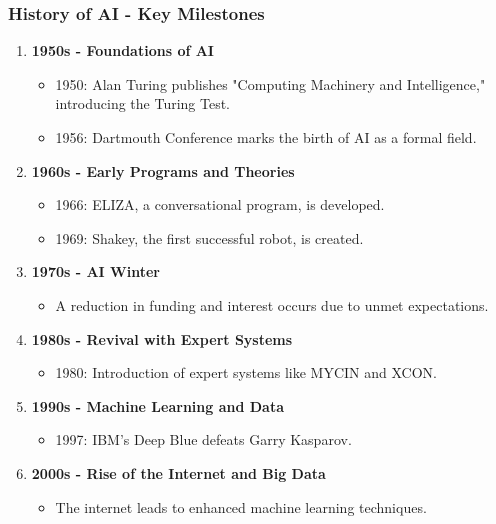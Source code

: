 \documentclass[aspectratio=169]{beamer}
\begin{document}
\begin{frame}[fragile]
    \frametitle{History of AI - Key Milestones}
    \begin{enumerate}
        \item \textbf{1950s - Foundations of AI}
        \begin{itemize}
            \item 1950: Alan Turing publishes "Computing Machinery and Intelligence," introducing the Turing Test.
            \item 1956: Dartmouth Conference marks the birth of AI as a formal field.
        \end{itemize}

        \item \textbf{1960s - Early Programs and Theories}
        \begin{itemize}
            \item 1966: ELIZA, a conversational program, is developed.
            \item 1969: Shakey, the first successful robot, is created.
        \end{itemize}

        \item \textbf{1970s - AI Winter}
        \begin{itemize}
            \item A reduction in funding and interest occurs due to unmet expectations.
        \end{itemize}

        \item \textbf{1980s - Revival with Expert Systems}
        \begin{itemize}
            \item 1980: Introduction of expert systems like MYCIN and XCON.
        \end{itemize}

        \item \textbf{1990s - Machine Learning and Data}
        \begin{itemize}
            \item 1997: IBM's Deep Blue defeats Garry Kasparov.
        \end{itemize}

        \item \textbf{2000s - Rise of the Internet and Big Data}
        \begin{itemize}
            \item The internet leads to enhanced machine learning techniques.
        \end{itemize}


\end{enumerate}
\end{frame}
\end{document}
